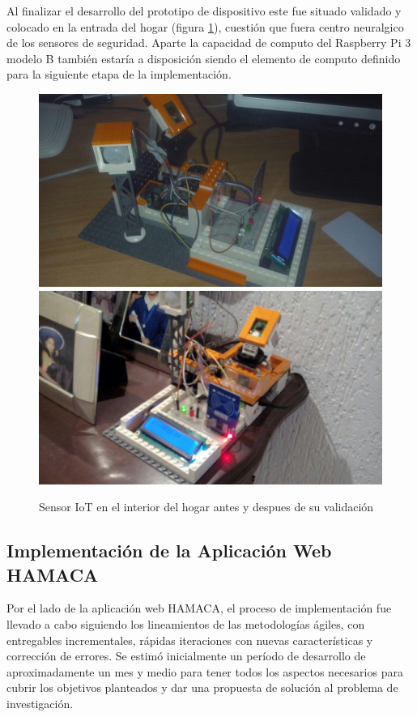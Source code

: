 Al finalizar el desarrollo del prototipo de dispositivo este fue situado validado y colocado en la entrada del hogar (figura \ref{fig:rpi3peter_zero}), cuestión que fuera centro neuralgico de los sensores de seguridad. Aparte la capacidad de computo del Raspberry Pi 3 modelo B también estaría a disposición siendo el elemento de computo definido para la siguiente etapa de la implementación.
\begin{figure}[!htb]
\centering
\includegraphics[scale=0.2]{./Figuras/rpi3peter_zero_proto.jpg}
\includegraphics[scale=0.15]{./Figuras/rpi3peter_zero.jpg}
\caption{Sensor IoT en el interior del hogar antes y despues de su validación}
\label{fig:rpi3peter_zero}
\vspace*{-10pt}
\end{figure}


\subsection{Implementación de la Aplicación Web HAMACA}
Por el lado de la aplicación web HAMACA, el proceso de implementación fue llevado a cabo siguiendo los lineamientos de las metodologías ágiles, con entregables incrementales, rápidas iteraciones con nuevas características y corrección de errores. Se estimó inicialmente un período de desarrollo de aproximadamente un mes y medio para tener todos los aspectos necesarios para cubrir los objetivos planteados y dar una propuesta de solución al problema de investigación.

